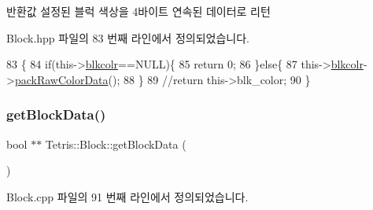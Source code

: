\begin{DoxyReturn}{반환값}
설정된 블럭 색상을 4바이트 연속된 데이터로 리턴 
\end{DoxyReturn}


Block.\+hpp 파일의 83 번째 라인에서 정의되었습니다.


\begin{DoxyCode}
83                                              \{
84                 \textcolor{keywordflow}{if}(this->\hyperlink{class_tetris_1_1_block_ab7cfb062eb49e791c94bac4a2e7a7ca9}{blkcolr}==NULL)\{
85                     \textcolor{keywordflow}{return} 0;
86                 \}\textcolor{keywordflow}{else}\{
87                     this->\hyperlink{class_tetris_1_1_block_ab7cfb062eb49e791c94bac4a2e7a7ca9}{blkcolr}->\hyperlink{class_tetris_1_1_block_sub_modules_1_1_block_color_a849ebbb0e900c5efdcb99784767e7a7a}{packRawColorData}();
88                 \}
89                 \textcolor{comment}{//return this->blk\_color;}
90             \}
\end{DoxyCode}
\mbox{\label{class_tetris_1_1_block_a9bd2c3d6ccacff9a5f56f72336ba324f}} 
\subsubsection{\texorpdfstring{get\+Block\+Data()}{getBlockData()}\hspace{0.1cm}{\footnotesize\ttfamily [1/2]}}
{\footnotesize\ttfamily bool $\ast$$\ast$ Tetris\+::\+Block\+::get\+Block\+Data (\begin{DoxyParamCaption}{ }\end{DoxyParamCaption})}



Block.\+cpp 파일의 91 번째 라인에서 정의되었습니다.


